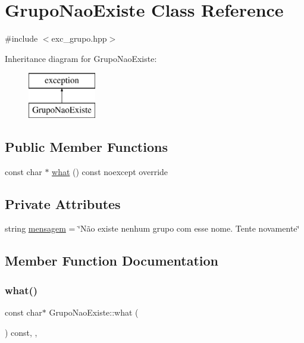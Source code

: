 \hypertarget{classGrupoNaoExiste}{}\section{Grupo\+Nao\+Existe Class Reference}
\label{classGrupoNaoExiste}


{\ttfamily \#include $<$exc\+\_\+grupo.\+hpp$>$}

Inheritance diagram for Grupo\+Nao\+Existe\+:\begin{figure}[H]
\begin{center}
\leavevmode
\includegraphics[height=2.000000cm]{classGrupoNaoExiste}
\end{center}
\end{figure}
\subsection*{Public Member Functions}
\begin{DoxyCompactItemize}
\item 
const char $\ast$ \hyperlink{classGrupoNaoExiste_afaddb4269a1b225b0f1045ae29fe8d6f}{what} () const noexcept override
\end{DoxyCompactItemize}
\subsection*{Private Attributes}
\begin{DoxyCompactItemize}
\item 
string \hyperlink{classGrupoNaoExiste_ae3a886240476581b33f88327c3282525}{mensagem} = \char`\"{}Não existe nenhum grupo com esse nome. Tente novamente\char`\"{}
\end{DoxyCompactItemize}


\subsection{Member Function Documentation}
\mbox{\label{classGrupoNaoExiste_afaddb4269a1b225b0f1045ae29fe8d6f}} 
\subsubsection{\texorpdfstring{what()}{what()}}
{\footnotesize\ttfamily const char$\ast$ Grupo\+Nao\+Existe\+::what (\begin{DoxyParamCaption}{ }\end{DoxyParamCaption}) const\hspace{0.3cm}{\ttfamily [inline]}, {\ttfamily [override]}, {\ttfamily [noexcept]}}



